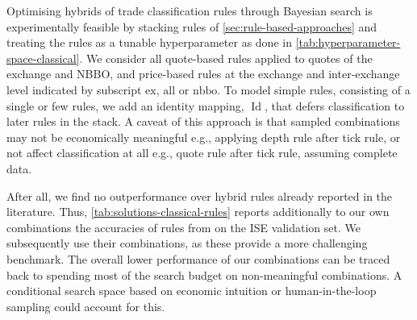 Optimising hybrids of trade classification rules through Bayesian search is experimentally feasible by stacking rules of \cref{sec:rule-based-approaches} and treating the rules as a tunable hyperparameter as done in \cref{tab:hyperparameter-space-classical}. We consider all quote-based rules applied to quotes of the exchange and \gls{NBBO}, and price-based rules at the exchange and inter-exchange level indicated by subscript $\text{ex}$, $\text{all}$ or $\text{nbbo}$. To model simple rules, consisting of a single or few rules, we add an identity mapping, $\operatorname{Id}$, that defers classification to later rules in the stack. A caveat of this approach is that sampled combinations may not be economically meaningful e.g., applying depth rule after tick rule, or not affect classification at all e.g., quote rule after tick rule, assuming complete data.


After all, we find no outperformance over hybrid rules already reported in the literature. Thus, \cref{tab:solutions-classical-rules} reports additionally to our own combinations the accuracies of rules from \textcite[][14]{grauerOptionTradeClassification2022} on the \gls{ISE} validation set. We subsequently use their combinations, as these provide a more challenging benchmark. The overall lower performance of our combinations can be traced back to spending most of the search budget on non-meaningful combinations. A conditional search space based on economic intuition or human-in-the-loop sampling could account for this.

